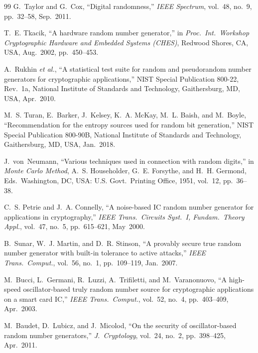 \documentclass[conference]{IEEEtran}
\begin{document}
\begin{thebibliography}{99}
G.~Taylor and G.~Cox, ``Digital randomness,''
\emph{IEEE Spectrum}, vol.~48, no.~9, pp.~32--58, Sep.~2011.

T.~E. Tkacik, ``A hardware random number generator,'' in
\emph{Proc.\ Int.\ Workshop Cryptographic Hardware and Embedded Systems
(CHES)}, Redwood Shores, CA, USA, Aug.~2002, pp.~450--453.

A.~Rukhin \emph{et al.}, ``A statistical test suite for random and
pseudorandom number generators for cryptographic applications,''
NIST Special Publication 800-22, Rev.~1a, National Institute of
Standards and Technology, Gaithersburg, MD, USA, Apr.~2010.

M.~S. Turan, E.~Barker, J.~Kelsey, K.~A. McKay, M.~L. Baish, and
M.~Boyle, ``Recommendation for the entropy sources used for random
bit generation,'' NIST Special Publication 800-90B, National
Institute of Standards and Technology, Gaithersburg, MD, USA,
Jan.~2018.

J.~von~Neumann, ``Various techniques used in connection with random
digits,'' in \emph{Monte Carlo Method}, A.~S. Householder, G.~E.
Forsythe, and H.~H. Germond, Eds.\ Washington, DC, USA: U.S. Govt.\
Printing Office, 1951, vol.~12, pp.~36--38.

C.~S. Petrie and J.~A. Connelly, ``A noise-based IC random number
generator for applications in cryptography,''
\emph{IEEE Trans.\ Circuits Syst.\ I, Fundam.\ Theory Appl.},
vol.~47, no.~5, pp.~615--621, May~2000.

B.~Sunar, W.~J. Martin, and D.~R. Stinson, ``A provably secure true
random number generator with built-in tolerance to active attacks,''
\emph{IEEE Trans.\ Comput.}, vol.~56, no.~1, pp.~109--119, Jan.~2007.

M.~Bucci, L.~Germani, R.~Luzzi, A.~Trifiletti, and M.~Varanonuovo,
``A high-speed oscillator-based truly random number source for
cryptographic applications on a smart card IC,''
\emph{IEEE Trans.\ Comput.}, vol.~52, no.~4, pp.~403--409, Apr.~2003.

M.~Baudet, D.~Lubicz, and J.~Micolod, ``On the security
of oscillator-based random number generators,''
\emph{J.\ Cryptology}, vol.~24, no.~2, pp.~398--425, Apr.~2011.


\end{thebibliography}
\end{document}

